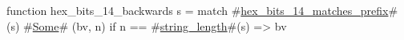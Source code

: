 function hex_bits_14_backwards s =
  match #\hyperref[sailRISCVzhexzybitszy14zymatcheszyprefix]{hex\_bits\_14\_matches\_prefix}#(s) {
      #\hyperref[sailRISCVzSome]{Some}# (bv, n) if n == #\hyperref[sailRISCVzstringzylength]{string\_length}#(s) => bv
  }
